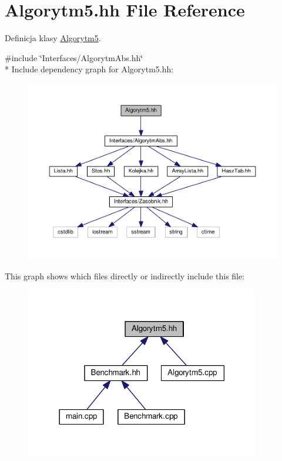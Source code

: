 \hypertarget{a00027}{}\section{Algorytm5.\+hh File Reference}
\label{a00027}


Definicja klasy \hyperlink{a00006}{Algorytm5}.  


{\ttfamily \#include \char`\"{}Interfaces/\+Algorytm\+Abs.\+hh\char`\"{}}\\*
Include dependency graph for Algorytm5.\+hh\+:
\nopagebreak
\begin{figure}[H]
\begin{center}
\leavevmode
\includegraphics[width=350pt]{a00066}
\end{center}
\end{figure}
This graph shows which files directly or indirectly include this file\+:
\nopagebreak
\begin{figure}[H]
\begin{center}
\leavevmode
\includegraphics[width=290pt]{a00067}
\end{center}
\end{figure}
